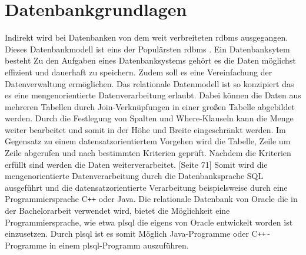 \section{Datenbankgrundlagen} 
Indirekt wird bei Datenbanken von dem weit verbreiteten \acrfull{rdbms} ausgegangen. Dieses Datenbankmodell ist eins der Populärsten \acrshort{rdbms} \cite{DB16}.  Ein Datenbanksytem besteht Zu den Aufgaben eines Datenbanksystems gehört es die Daten möglichst effizient und dauerhaft zu speichern. Zudem soll es eine Vereinfachung der Datenverwaltung ermöglichen. Das relationale Datenmodell ist so konzipiert das es eine mengenorientierte Datenverarbeitung erlaubt. Dabei können die Daten aus mehreren Tabellen durch Join-Verknüpfungen in einer großen Tabelle abgebildet werden. Durch die Festlegung von Spalten und Where-Klauseln kann die Menge weiter bearbeitet und somit in der Höhe und Breite eingeschränkt werden. Im Gegensatz zu einem datensatzorientiertem Vorgehen wird die Tabelle, Zeile um Zeile abgerufen und nach bestimmten Kriterien geprüft. Nachdem die Kriterien erfüllt sind werden die Daten weiterverarbeitet. \cite{Kemper2011}[Seite 71] Somit wird die mengenorientierte Datenverarbeitung durch die Datenbanksprache SQL ausgeführt und die datensatzorientierte Verarbeitung beispielsweise durch eine Programmiersprache C\texttt{++} oder Java. Die relationale Datenbank von Oracle die in der Bachelorarbeit verwendet wird, bietet die Möglichkeit eine Programmiersprache, wie etwa \acrshort{plsql} die eigens von Oracle entwickelt worden ist einzusetzen. Durch \acrshort{plsql} ist es somit Möglich Java-Programme oder C\texttt{++}\,-Programme in einem \acrshort{plsql}-Programm auszuführen.

